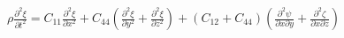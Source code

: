 \documentclass[preview]{standalone}
\begin{document}
\begin{center}
$\rho\frac{\partial^2\xi}{\partial t^2} = C_{11}\frac{\partial^2\xi}{\partial x^2}+
                C_{44}\left( \frac{\partial^2\xi}{\partial y^2}+\frac{\partial^2\xi}{\partial z^2}\right)+
                (C_{12} + C_{44})\left( \frac{\partial ^2\psi}{\partial x\partial y}+\frac{\partial^2\zeta}{\partial x \partial z}\right)$
\end{center}
\end{document}
